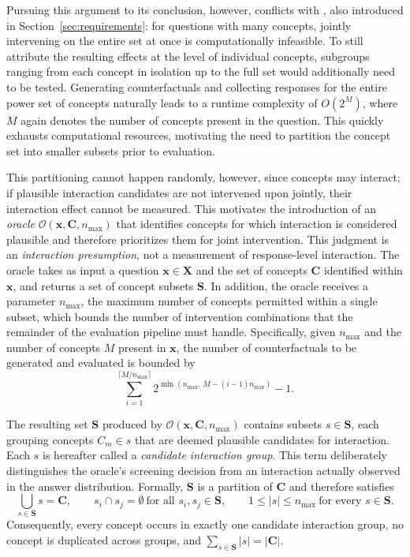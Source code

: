 Pursuing this argument to its conclusion, however, conflicts with , also introduced in Section~\ref{sec:requirements}: for questions with many concepts, jointly intervening on the entire set at once is computationally infeasible. To still attribute the resulting effects at the level of individual concepts, subgroups ranging from each concept in isolation up to the full set would additionally need to be tested. Generating counterfactuals and collecting responses for the entire power set of concepts naturally leads to a runtime complexity of $O(2^M)$, where $M$ again denotes the number of concepts present in the question. This quickly exhausts computational resources, motivating the need to partition the concept set into smaller subsets prior to evaluation.

This partitioning cannot happen randomly, however, since concepts may interact; if plausible interaction candidates are not intervened upon jointly, their interaction effect cannot be measured. This motivates the introduction of an \emph{oracle} $\mathcal{O}(\mathbf{x}, \mathbf{C}, n_{\max})$ that identifies concepts for which interaction is considered plausible and therefore prioritizes them for joint intervention. This judgment is an \emph{interaction presumption}, not a measurement of response-level interaction. The oracle takes as input a question $\mathbf{x} \in \mathbf{X}$ and the set of concepts $\mathbf{C}$ identified within $\mathbf{x}$, and returns a set of concept subsets $\mathbf{S}$. In addition, the oracle receives a parameter $n_{\max}$, the maximum number of concepts permitted within a single subset, which bounds the number of intervention combinations that the remainder of the evaluation pipeline must handle. Specifically, given $n_{\max}$ and the number of concepts $M$ present in $\mathbf{x}$, the number of counterfactuals to be generated and evaluated is bounded by
\begin{equation}
	\label{eq:subset_counterfactual_bound}
	\sum_{i=1}^{\lceil M/n_{\max} \rceil} 2^{\min(n_{\max},\, M - (i-1)n_{\max})} - 1.
\end{equation}

The resulting set $\mathbf{S}$ produced by $\mathcal{O}(\mathbf{x}, \mathbf{C}, n_{\max})$ contains subsets $s \in \mathbf{S}$, each grouping concepts $C_m \in s$ that are deemed plausible candidates for interaction. Each $s$ is hereafter called a \emph{candidate interaction group}. This term deliberately distinguishes the oracle's screening decision from an interaction actually observed in the answer distribution. Formally, $\mathbf{S}$ is a partition of $\mathbf{C}$ and therefore satisfies
\begin{equation}
	\bigcup_{s\in\mathbf{S}}s=\mathbf{C},
	\qquad
	s_i\cap s_j=\emptyset\ \text{for all }s_i,s_j\in\mathbf{S},
	\qquad
	1\leq |s|\leq n_{\max}\ \text{for every }s\in\mathbf{S}.
\end{equation}
Consequently, every concept occurs in exactly one candidate interaction group, no concept is duplicated across groups, and $\sum_{s\in\mathbf{S}}|s|=|\mathbf{C}|$.

